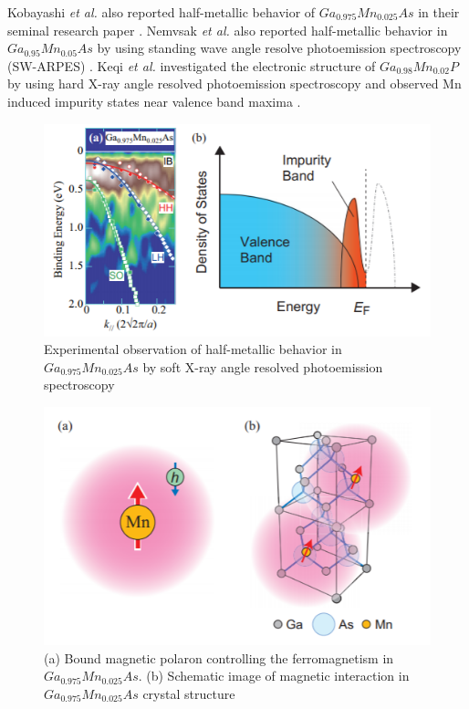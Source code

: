 \documentclass[main.tex]{subfiles}
\begin{document}
 Kobayashi \textit{et al.} also reported half-metallic behavior of $Ga_{0.975}Mn_{0.025}As$ in their seminal research paper \cite{kobayashi2014unveiling}. Nemvsak \textit{et al.} also reported half-metallic behavior in $Ga_{0.95}Mn_{0.05}As$ by using standing wave angle resolve photoemission spectroscopy (SW-ARPES) \cite{nemvsak2018element}. Keqi \textit{et al.} investigated the electronic structure of $Ga_{0.98}Mn_{0.02}P$ by using hard X-ray angle resolved photoemission spectroscopy and observed Mn induced impurity states near valence band maxima \cite{keqi2018electronic}.

\begin{figure}[!htb]
	\centering
	\includegraphics[width=0.8\linewidth]{kobayashi}
	\caption{Experimental observation of half-metallic behavior in $Ga_{0.975}Mn_{0.025}As$ by soft X-ray angle resolved photoemission spectroscopy \cite{kobayashi2014unveiling}}
	\label{fig:TEM_PT}
\end{figure}
\FloatBarrier

\begin{figure}[!htb]
	\centering
	\includegraphics[width=0.8\linewidth]{kobayashi2}
	\caption{(a) Bound magnetic polaron controlling the ferromagnetism in $Ga_{0.975}Mn_{0.025}As$. (b) Schematic image of magnetic interaction in $Ga_{0.975}Mn_{0.025}As$ crystal structure \cite{kobayashi2014unveiling}}
	\label{fig:TEM_PT}
\end{figure}
\FloatBarrier
\end{document}
